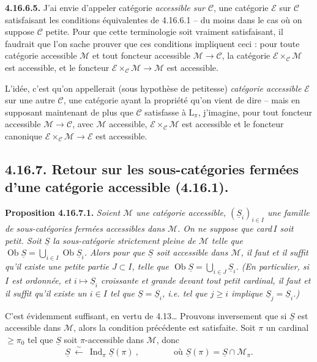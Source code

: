\documentclass[11pt]{article}
\newcommand{\printedpage}[1]{\marginpar{\footnotesize p.~#1}}
\newcommand{\msp}[1]{\marginpar{\footnotesize [#1]}}
\newcommand{\Ob}{\operatorname{Ob}}
\newcommand{\Ind}{\operatorname{Ind}}
\newcommand{\cM}{\mathcal{M}}
\newcommand{\cE}{\mathcal{E}}
\newcommand{\cC}{\mathcal{C}}
\newcommand{\uS}{\underline{S}}
\begin{document}
\textbf{4.16.6.5.} J'ai envie d'appeler catégorie \textit{accessible sur $\cC$}, une catégorie $\cE$ sur $\cC$ satisfaisant les conditions équivalentes de 4.16.6.1 -- du moins dans le cas où on suppose $\cC$ petite. Pour que cette terminologie soit vraiment satisfaisant, il faudrait que l'on sache prouver que ces conditions impliquent ceci : pour toute catégorie accessible $\cM$ et tout foncteur accessible $\cM \longrightarrow \cC$, la catégorie $\cE \times_{\cC} \cM$ est accessible, et le foncteur $\cE \times_{\cC} \cM \longrightarrow \cM$ est accessible. %

\msp{page 476bis}
L'idée, c'est qu'on appellerait (sous hypothèse de petitesse) \textit{catégorie accessible $\cE$} sur une autre $\cC$, une catégorie ayant la propriété qu'on vient de dire -- mais en supposant maintenant de plus que $\cC$ satisfasse à $\mathrm{L}_\pi$, j'imagine, pour tout foncteur accessible $\cM \longrightarrow \cC$, avec $\cM$ accessible, $\cE \times_{\cC} \cM$ est accessible et le foncteur canonique $\cE \times_{\cC} \cM \longrightarrow \cE$ est accessible.

\msp{page 477}
\subsection*{4.16.7. Retour sur les sous-catégories fermées d'une catégorie accessible (4.16.1).}

\textbf{Proposition 4.16.7.1.} \textit{Soient $\cM$ une catégorie accessible, $(\uS_i)_{i\in I}$ une famille de sous-catégories fermées accessibles dans $\cM$. On ne suppose que \textup{card}\,$I$ soit petit. Soit $\uS$ la sous-catégorie strictement pleine de $\cM$ telle que $\Ob \uS = \bigcup_{i\in I} \Ob \uS_i$. Alors pour que $\uS$ %
\printedpage{185}
soit accessible dans $\cM$, il faut et il suffit qu'il existe une \textup{petite} partie $J \subset I$, telle que $\Ob \uS = \bigcup_{i\in J} \uS_i$. (En particulier, si $I$ est ordonnée, et $i \longmapsto \uS_i$ croissante et grande devant tout petit cardinal, il faut et il suffit qu'il existe un $i \in I$ tel que $\uS = \uS_i$, i.e. tel que $j \geqslant i$ implique $\uS_j = \uS_i$.)}

C'est évidemment suffisant, en vertu de 4.13\dots{} Prouvons inversement que si $\uS$ est accessible dans $\cM$, alors la condition précédente est satisfaite. Soit $\pi$ un cardinal $\geqslant \pi_0$ tel que $\uS$ soit $\pi$-accessible dans $\cM$, donc
\[
\uS \ \xleftarrow{\ \sim\ }\ \Ind_\pi \uS(\pi) \ , \qquad\qquad \text{où } \uS(\pi) = \uS \cap \cM_\pi.
\]
\end{document}
